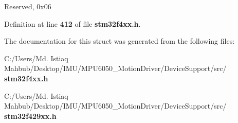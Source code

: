 Reserved, 0x06 

Definition at line \textbf{ 412} of file \textbf{ stm32f4xx.\+h}.



The documentation for this struct was generated from the following files\+:\begin{DoxyCompactItemize}
\item 
C\+:/\+Users/\+Md. Istiaq Mahbub/\+Desktop/\+I\+M\+U/\+M\+P\+U6050\+\_\+\+Motion\+Driver/\+Device\+Support/src/\textbf{ stm32f4xx.\+h}\item 
C\+:/\+Users/\+Md. Istiaq Mahbub/\+Desktop/\+I\+M\+U/\+M\+P\+U6050\+\_\+\+Motion\+Driver/\+Device\+Support/src/\textbf{ stm32f429xx.\+h}\end{DoxyCompactItemize}
